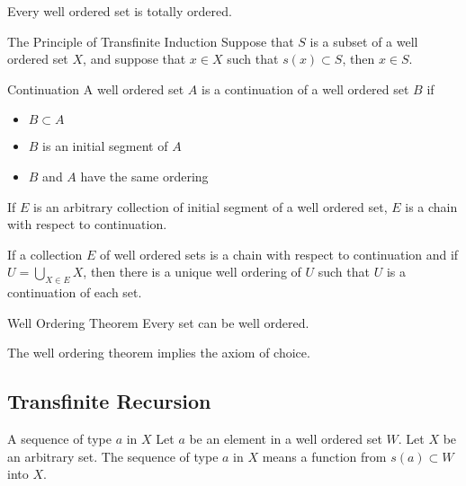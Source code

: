 \documentclass[a4paper]{article}
\begin{document}
\begin{thm}{}{} Every well ordered set is totally ordered. 
\end{thm}

\begin{thm}{The Principle of Transfinite Induction}{} Suppose that $S$ is a subset of a well ordered set $X$, and suppose that $x\in X$ such that $s(x)\subset S$, then $x\in S$. 
\end{thm}

\begin{defn}{Continuation}{} A well ordered set $A$ is a continuation of a well ordered set $B$ if
\begin{itemize}
\item $B\subset A$
\item $B$ is an initial segment of $A$
\item $B$ and $A$ have the same ordering
\end{itemize}
\end{defn}

\begin{thm}{}{} If $E$ is an arbitrary collection of initial segment of a well ordered set, $E$ is a chain with respect to continuation. 
\end{thm}

\begin{thm}{}{} If a collection $E$ of well ordered sets is a chain with respect to continuation and if $U=\bigcup_{X\in E}X$, then there is a unique well ordering of $U$ such that $U$ is a continuation of each set. 
\end{thm}

\begin{thm}{Well Ordering Theorem}{} Every set can be well ordered. 
\end{thm}

\begin{prp}{}{} The well ordering theorem implies the axiom of choice. 
\end{prp}

\subsection{Transfinite Recursion}
\begin{defn}{A sequence of type $a$ in $X$}{} Let $a$ be an element in a well ordered set $W$. Let $X$ be an arbitrary set. The sequence of type $a$ in $X$ means a function from $s(a)\subset W$ into $X$. 
\end{defn}
\end{document}
